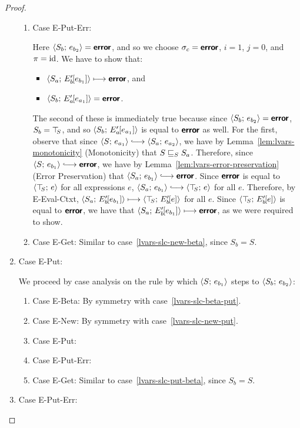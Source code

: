 \begin{proof}
\begin{enumerate}
\begin{enumerate}
    \item \label{lvars-slc-new-put-err}Case {\sc E-Put-Err}:

      Here $\langle S_b;\, e_{b_2} \rangle = \textbf{\textsf{error}}$, and so we choose $\sigma_c
      = \textbf{\textsf{error}}$, $i = 1$, $j = 0$, and $\pi = \mathrm{id}$.  We have to show
      that:
      \begin{itemize}
      \item $\langle S_a;\, E'_b\hspace{-1mm}\left[e_{b_1}\right] \rangle \longmapsto
        \textbf{\textsf{error}}$, and
      \item
        $\langle S_b;\, E'_a\hspace{-1mm}\left[e_{a_1}\right] \rangle = \textbf{\textsf{error}}$.
      \end{itemize}

      The second of these is immediately true because since
      $\langle S_b;\, e_{b_2} \rangle = \textbf{\textsf{error}}$, $S_b = \top\hspace{-0.85mm}_{S}$, and so
      $\langle S_b;\, E'_a\hspace{-1mm}\left[e_{a_1}\right] \rangle$ is equal to $\textbf{\textsf{error}}$ as
      well.  For the first, observe that since $\config{S}{e_{a_1}}
      \parstepsto \config{S_a}{e_{a_2}}$, we have by
      Lemma~\ref{lem:lvars-monotonicity} (Monotonicity) that
      $S \sqsubseteq_S S_a$.  Therefore, since $\config{S}{e_{b_1}}
      \parstepsto \error$, we have by
      Lemma~\ref{lem:lvars-error-preservation} (Error Preservation)
      that $\config{S_a}{e_{b_1}} \parstepsto \error$.  Since $\textbf{\textsf{error}}$
      is equal to $\langle \top\hspace{-0.85mm}_{S};\, e \rangle$ for all expressions $e$,
      $\config{S_a}{e_{b_1}} \parstepsto \config{\topS}{e}$ for all
      $e$.  Therefore, by {\sc E-Eval-Ctxt},
      $\langle S_a;\, E'_b\hspace{-1mm}\left[e_{b_1}\right] \rangle \longmapsto
      \langle \top\hspace{-0.85mm}_{S};\, E'_b\hspace{-1mm}\left[e\right] \rangle$ for all $e$.  Since
      $\langle \top\hspace{-0.85mm}_{S};\, E'_b\hspace{-1mm}\left[e\right] \rangle$ is equal to $\textbf{\textsf{error}}$, we
      have that $\langle S_a;\, E'_b\hspace{-1mm}\left[e_{b_1}\right] \rangle \longmapsto
      \textbf{\textsf{error}}$, as we were required to show.

    \item \label{lvars-slc-new-get}Case {\sc E-Get}: Similar to
      case~\ref{lvars-slc-new-beta}, since $S_b = S$.
    \end{enumerate}
  \item Case {\sc E-Put}:

    We proceed by case analysis on the rule by which
    $\langle S;\, e_{b_1} \rangle$ steps to $\langle S_b;\, e_{b_2} \rangle$:
    \begin{enumerate}
    \item \label{lvars-slc-put-beta}Case {\sc E-Beta}: By symmetry with case~\ref{lvars-slc-beta-put}.
    \item \label{lvars-slc-put-new}Case {\sc E-New}: By symmetry with case~\ref{lvars-slc-new-put}.
    \item \label{lvars-slc-put-put}Case {\sc E-Put}: \TODO{}
    \item \label{lvars-slc-put-put-err}Case {\sc E-Put-Err}: \TODO{}
    \item \label{lvars-slc-put-get}Case {\sc E-Get}: Similar to
      case~\ref{lvars-slc-put-beta}, since $S_b = S$.
    \end{enumerate}
  \item Case {\sc E-Put-Err}:


\end{enumerate}
\end{proof}
